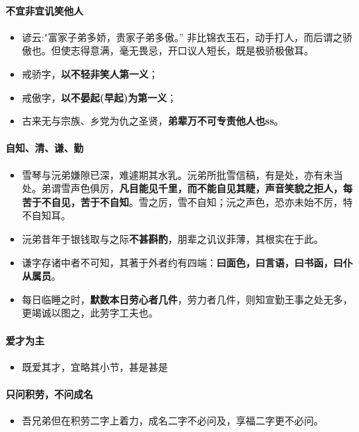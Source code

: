 \documentclass[UTF8,a4paper,8pt]{ctexbook}
\begin{document}
		 \paragraph{不宜非宜讥笑他人}
			 \begin{itemize}
			 	\item 谚云:"富家子弟多娇，贵家子弟多傲。” 非比锦衣玉石，动手打人，而后谓之骄傲也。但使志得意满，毫无畏忌，开口议人短长，既是极骄极傲耳。
			 	\item 戒骄字，\textbf{以不轻非笑人第一义}；
			 	\item 戒傲字，\textbf{以不晏起(早起)为第一义}；
			 	\item 古来无与宗族、乡党为仇之圣贤，\textbf{弟辈万不可专责他人也ss}。
			 \end{itemize}

		\paragraph{自知、清、谦、勤}
			\begin{itemize}
				\item  雪琴与沅弟嫌隙已深，难遽期其水乳。沅弟所批雪信稿，有是处，亦有未当处。弟谓雪声色俱厉，\textbf{凡目能见千里，而不能自见其睫，声音笑貌之拒人，每苦于不自见，苦于不自知}。雪之厉，雪不自知；沅之声色，恐亦未始不厉，特不自知耳。
				\item 沅弟昔年于银钱取与之际\textbf{不甚斟酌}，朋辈之讥议菲薄，其根实在于此。
				\item 谦字存诸中者不可知，其著于外者约有四端：\textbf{曰面色，曰言语，曰书函，曰仆从属员}。
				\item 每日临睡之时，\textbf{默数本日劳心者几件}，劳力者几件，则知宣勤王事之处无多，更竭诚以图之，此劳字工夫也。
			\end{itemize}
		
		\paragraph{爱才为主}
			\begin{itemize}
				\item 既爱其才，宜略其小节，甚是甚是
			\end{itemize}

		\paragraph{只问积劳，不问成名}
			\begin{itemize}
				\item 吾兄弟但在积劳二字上着力，成名二字不必问及，享福二字更不必问。
			\end{itemize}
\end{document}
